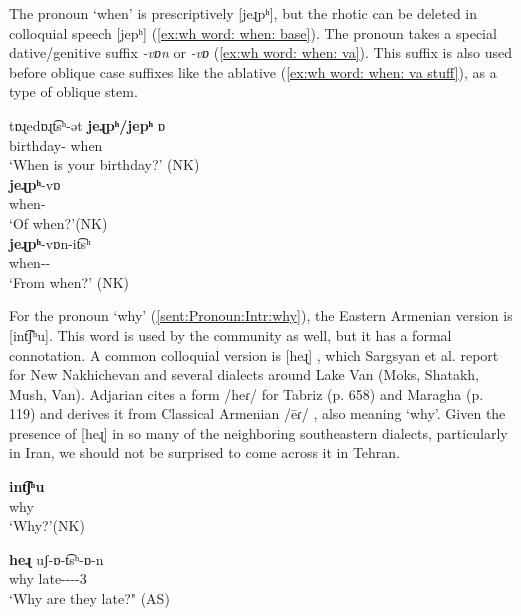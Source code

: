 The pronoun `when' is prescriptively [jeɻpʰ], but the rhotic can be deleted in colloquial speech [jepʰ] (\ref{ex:wh word: when: base}). The pronoun takes a special dative/genitive suffix \textit{-vɒn} or \textit{-vɒ} (\ref{ex:wh word: when: va}). This suffix is also used before oblique case suffixes like the ablative (\ref{ex:wh word: when: va stuff}), as a type of oblique stem. 

\begin{exe}
	
	
	\ex 
	\begin{xlist}
		\ex \gll tɒɻedɒɻt͡sʰ-ət \textbf{jeɻpʰ/jepʰ} ɒ \\
		birthday-{\possSsg} when  {\auxgloss} \\
		\trans `When is your birthday?'\label{ex:wh word: when: base} \hfill (NK)
		\\ 
		\ex \gll \textbf{jeɻpʰ}-vɒ   \\
		when-{\gen} \\
		\trans `Of when?'\label{ex:wh word: when: va}\hfill (NK) \\
		\ex \gll \textbf{jeɻpʰ}-vɒn-it͡sʰ \\
		when-{\dat}-{\abl} \\
		\trans `From when?'\label{ex:wh word: when: va stuff} \hfill (NK)\\
	\end{xlist}
\end{exe}

For the pronoun `why' (\ref{sent:Pronoun:Intr:why}), the Eastern Armenian version is [int͡ʃʰu]. This word is used by the {\iaIA} community as well, but it has a formal connotation. A common colloquial version is [heɻ] , which Sargsyan et al.  \citep[vol. 4: p.  227]{DialectDictionary-2001} report for  New Nakhichevan and several dialects around Lake Van (Moks, Shatakh, Mush, Van). Adjarian  \citep{Adjarian-1979-Etymology}  cites a form /heɾ/   for Tabriz (p. 658) and Maragha (p.  119) and derives it from Classical Armenian /ēɾ/ , also meaning ‘why'. Given the presence of [heɻ]  in so many of the neighboring southeastern dialects, particularly in Iran, we should not be surprised to come across it in Tehran. 


\begin{exe}
	\ex \label{sent:Pronoun:Intr:why}\begin{xlist} 
		
		\ex \gll \textbf{int͡ʃʰu} \\
		why \\
		\trans `Why?'\hfill (NK) \\
		\armenian{Ինչո՞ւ։}
		
		\ex \gll \textbf{heɻ} uʃ-ɒ-t͡sʰ-ɒ-n \\
		why late-{\lvgloss}-{\aorperf}-{\pst}-3{\pl} \\
		\trans `Why are they late?" \hfill (AS) \\
		\armenian{Հե՞ր ուշացան։}
\end{xlist}	\end{exe}

